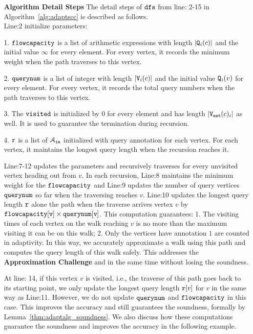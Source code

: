 \textbf{Algorithm Detail Steps}
The detail steps of $\mathtt{dfs}$
from line: 2-15 in Algorithm~\ref{alg:adaptscc}
is described as follows.
 \\
Line:2 initialize parameters:

1. 
 $\mathtt{flowcapacity}$ is a list of arithmetic expressions with length $|\mathtt{Q}_i(c)|$ and the initial value $\infty$ for every element. For every vertex, it records the minimum weight when the path traverses to this vertex.

2. $\mathtt{querynum}$ is a list of integer with length $|\mathtt{V}_i(c)|$ and the initial value $\mathtt{Q}_i(v)$ for every element. 
For every vertex, 
it records the total query numbers when the path traverses to this vertex.

3. The $\mathtt{visited}$ is initialized by $0$ for every element and has length $|\mathtt{{V_{est}}}(c)_i|$ as well. It is used to guarantee the termination during recursion.

4. $\mathtt{r}$ is a list of $\mathcal{A}_{\mathtt{in}}$ initialized with query annotation for each vertex. For each vertex, it maintains the longest query length when the recursion reaches it.

Line:7-12 updates the parameters and recursively traverses for every unvisited vertex heading out from $v$.
In each recursion,
Line:8 maintains the minimum weight for the 
$\mathtt{flowcapacity}$ and Line:9 updates the 
number of query vertices 
$\mathtt{querynum}$ so far when the traversing reaches $v$.
Line:10
updates the longest query length $\mathtt{r}$
alone the path when the traverse arrives vertex $v$ by $\mathtt{flowcapacity[v] \times querynum[v]}$.
This computation guarantees: 
1. The visiting times of each vertex on the walk reaching $v$ is no more than 
the maximum visiting it can be on this walk;
2. Only the vertices have annotation $1$ are counted in adaptivity.
In this way, we accurately approximate a walk using this path and computes the query length of this walk safely.
This addresses the \textbf{Approximation Challenge} and in the same time without losing the soundness.

At line: 14, if this vertex $v$ is visited, 
i.e., the traverse of this path goes back to its starting point,
we only update the longest query length $\mathtt{r}[v]$ for $v$ in the same way as Line:11.
However, we do not update
$\mathtt{querynum}$ and $\mathtt{flowcapacity}$ in this case.
This improves the accuracy and still guarantees the soundness, formally by Lemma~\ref{thm:adaptalg_soundness}. We also discuss how these computations guarantee the soundness and improves the accuracy in the following example.


